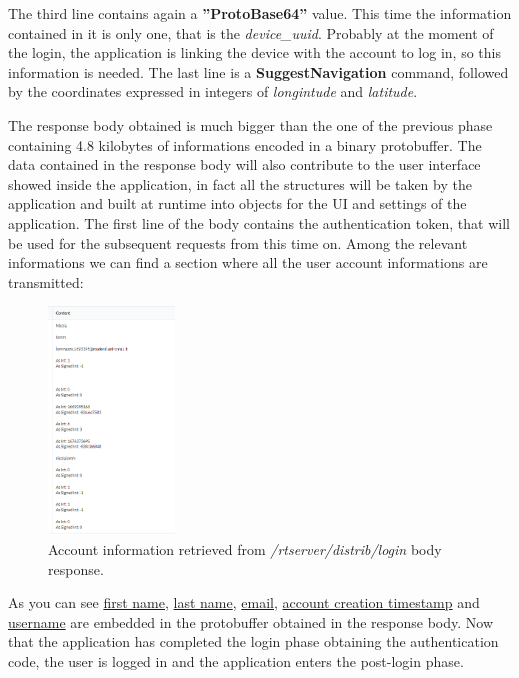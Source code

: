 			The third line contains again a \textbf{''ProtoBase64''} value. This time the information contained in it is only one, that is the \textit{device\_uuid}. Probably at the moment of the login, the application is linking the device with the account to log in, so this information is needed. \newline
			The last line is a \textbf{SuggestNavigation} command, followed by the coordinates expressed in integers of \textit{longintude} and \textit{latitude}.\newline
			\par The response body obtained is much bigger than the one of the previous phase containing 4.8 kilobytes of informations encoded in a binary protobuffer. The data contained in the response body will also contribute to the user interface showed inside the application, in fact all the structures will be taken by the application and built at runtime into objects for the UI and settings of the application. \newline
			The first line of the body contains the authentication token, that will be used for the subsequent requests from this time on. Among the relevant informations we can find a section where all the user account informations are transmitted:
			\begin{figure}[H]
				\centering
				\includegraphics[width=0.3\textwidth]{images/waze_loginaccountinfo.png}
				\caption{Account information retrieved from \textit{/rtserver/distrib/login} body response.}
			\end{figure}
			As you can see \underline{first name}, \underline{last name}, \underline{email}, \underline{account creation timestamp} and \underline{username} are embedded in the protobuffer obtained in the response body. \newline
			Now that the application has completed the login phase obtaining the authentication code, the user is logged in and the application enters the post-login phase.			
			
